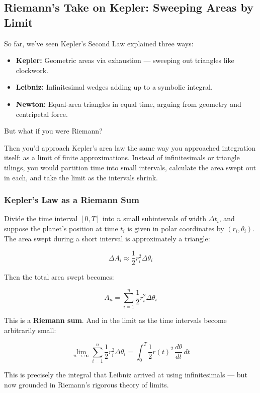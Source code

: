 \subsection{Riemann’s Take on Kepler: Sweeping Areas by Limit}

So far, we’ve seen Kepler’s Second Law explained three ways:

\begin{itemize}
  \item \textbf{Kepler:} Geometric areas via exhaustion — sweeping out triangles like clockwork.
  \item \textbf{Leibniz:} Infinitesimal wedges adding up to a symbolic integral.
  \item \textbf{Newton:} Equal-area triangles in equal time, arguing from geometry and centripetal force.
\end{itemize}

But what if you were Riemann?

Then you'd approach Kepler’s area law the same way you approached integration itself: as a limit of finite approximations. Instead of infinitesimals or triangle tilings, you would partition time into small intervals, calculate the area swept out in each, and take the limit as the intervals shrink.

\subsubsection*{Kepler’s Law as a Riemann Sum}

Divide the time interval \([0, T]\) into \(n\) small subintervals of width \( \Delta t_i \), and suppose the planet’s position at time \(t_i\) is given in polar coordinates by \( (r_i, \theta_i) \). The area swept during a short interval is approximately a triangle:

\[
\Delta A_i \approx \frac{1}{2} r_i^2 \Delta \theta_i
\]

Then the total area swept becomes:

\[
A_n = \sum_{i=1}^n \frac{1}{2} r_i^2 \Delta \theta_i
\]

This is a \textbf{Riemann sum}. And in the limit as the time intervals become arbitrarily small:

\[
\boxed{
\lim_{n \to \infty} \sum_{i=1}^n \frac{1}{2} r_i^2 \Delta \theta_i = \int_0^T \frac{1}{2} r(t)^2 \, \frac{d\theta}{dt} \, dt
}
\]

This is precisely the integral that Leibniz arrived at using infinitesimals — but now grounded in Riemann’s rigorous theory of limits.

